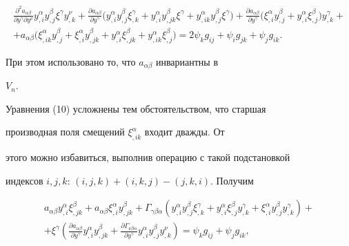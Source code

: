\begin{multline}


\frac{\partial^2a_{\alpha \beta }}{\partial y^\gamma \partial y^\nu }


y_{,i}^\alpha y_{,j}^\beta \xi^\gamma y_{,k}^\nu +\frac{\partial a_{\alpha


\beta }}{\partial y^\gamma }\big( y_{,i}^\alpha y_{,j}^\beta \xi


_{,k}^\gamma +y_{,i}^\alpha y_{,jk}^\beta \xi^\gamma +y_{,ik}^\alpha


y_{,j}^\beta \xi^\gamma \big) + 


\frac{\partial a_{\alpha \beta }}{\partial y^\gamma }\big(\xi_{,i}^\alpha


y_{,j}^\beta +y_{,i}^\alpha \xi_{,j}^\beta \big) y_{,k}^\gamma+\\


%


+a_{\alpha \beta }\big( \xi_{,ik}^\alpha y_{,j}^\beta +\xi_{,i}^\alpha


y_{,jk}^\beta +y_{,i}^\alpha \xi_{,jk}^\beta +y_{,ik}^\alpha \xi


_{,j}^\beta \big) =


2\psi_kg_{ij}+\psi_ig_{jk}+\psi_jg_{ik}.


\end{multline}


При этом использовано то, что $a_{\alpha \beta }$ инвариантны в


$V_n$. 





Уравнения (10) усложнены тем обстоятельством, что старшая


производная поля смещений $\xi_{,ik}^\alpha $ входит дважды. От


этого можно избавиться, выполнив операцию с такой подстановкой


индексов $i,j,k$: $(i,j,k)+(i,k,j)-(j,k,i)$. Получим


\begin{multline}


a_{\alpha \beta }y_{,i}^\alpha \xi_{,jk}^\beta +a_{\alpha \beta }\xi


_{,i}^\alpha y_{,jk}^\beta +\Gamma_{\gamma \beta \alpha }(y_{,i}^\alpha


y_{,j}^\beta \xi_{,k}^\gamma +y_{,i}^\alpha \xi_{,j}^\beta y_{,k}^\gamma


+\xi_{,i}^\alpha y_{,j}^\beta y_{,k}^\gamma )+  \\


+\xi^\gamma \left( \frac{\partial a_{\alpha \beta }}{\partial y^\gamma }


y_{,i}^\alpha y_{,jk}^\beta +\frac{\partial \Gamma_{\nu \beta \alpha }}{


\partial y^\gamma }y_{,i}^\alpha y_{,j}^\beta y_{,k}^\nu \right) =\psi


_kg_{ij}+\psi_jg_{ik},


\end{multline}


